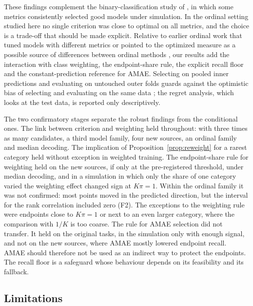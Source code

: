\documentclass[pdflatex,sn-mathphys-ay]{sn-jnl}
\theoremstyle{thmstyleone}
\theoremstyle{thmstylethree}
\begin{document}
These findings complement the binary-classification study of \citet{delaCruzHuayanay2024}, in which some metrics consistently selected good models under simulation. In the ordinal setting studied here no single criterion was close to optimal on all metrics, and the choice is a trade-off that should be made explicit. Relative to earlier ordinal work that tuned models with different metrics \citep{Binotto2025} or pointed to the optimized measure as a possible source of differences between ordinal methods \citep{Buczak2025}, our results add the interaction with class weighting, the endpoint-share rule, the explicit recall floor and the constant-prediction reference for AMAE. Selecting on pooled inner predictions and evaluating on untouched outer folds guards against the optimistic bias of selecting and evaluating on the same data \citep{Varma2006,Cawley2010}; the regret analysis, which looks at the test data, is reported only descriptively.

The two confirmatory stages separate the robust findings from the conditional ones. The link between criterion and weighting held throughout: with three times as many candidates, a third model family, four new sources, an ordinal family and median decoding. The implication of Proposition~\ref{prop:reweight} for a rarest category held without exception in weighted training. The endpoint-share rule for weighting held on the new sources, if only at the pre-registered threshold, under median decoding, and in a simulation in which only the share of one category varied the weighting effect changed sign at $K\pi=1$. Within the ordinal family it was not confirmed: most points moved in the predicted direction, but the interval for the rank correlation included zero (F2). The exceptions to the weighting rule were endpoints close to $K\pi=1$ or next to an even larger category, where the comparison with $1/K$ is too coarse. The rule for AMAE selection did not transfer. It held on the original tasks, in the simulation only with enough signal, and not on the new sources, where AMAE mostly lowered endpoint recall. AMAE should therefore not be used as an indirect way to protect the endpoints. The recall floor is a safeguard whose behaviour depends on its feasibility and its fallback.

\subsection{Limitations}
\end{document}
